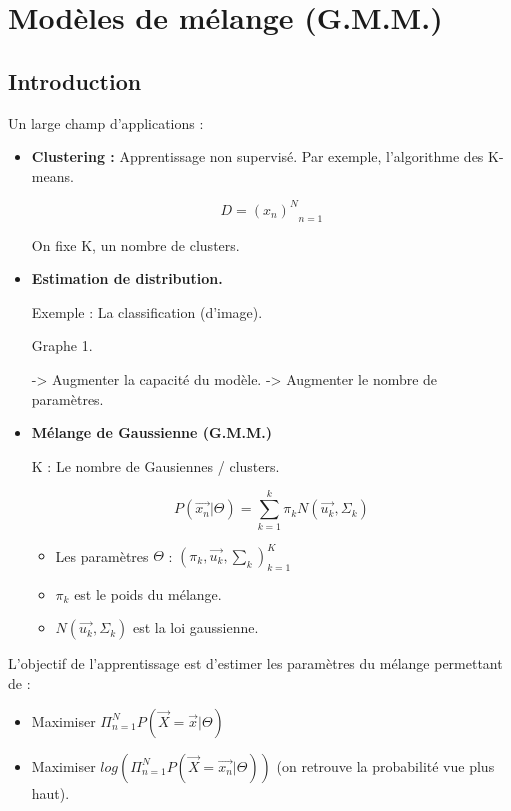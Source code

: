 \documentclass{article}
\begin{document}
\section{Modèles de mélange (G.M.M.)}

\subsection{Introduction}

Un large champ d'applications :

\begin{itemize}

\item \textbf{Clustering :} Apprentissage non supervisé. Par exemple, l'algorithme des K-means.

\[ D = {(x_n)^N}_{n=1}  \]

On fixe K, un nombre de clusters.

\item \textbf{Estimation de distribution.}

Exemple : La classification (d'image).

Graphe 1.

-> Augmenter la capacité du modèle.
-> Augmenter le nombre de paramètres.

\item \textbf{Mélange de Gaussienne (G.M.M.)}

K : Le nombre de Gausiennes / clusters.

\[ P(\vec{x_n} | \Theta) = \sum_{k=1}^k \pi_k N(\vec{u_k}, \Sigma_k) \]

\begin{itemize}

\item Les paramètres $\Theta$ : $(\pi_k, \vec{u_k}, \sum_k)_{k=1}^K$

\item $\pi_k$ est le poids du mélange.

\item $N(\vec{u_k}, \Sigma_k)$ est la loi gaussienne.

\end{itemize}

\end{itemize}

L'objectif de l'apprentissage est d'estimer les paramètres du mélange permettant de :

\begin{itemize}
\item Maximiser $ \Pi_{n=1}^N  P(\vec{X} = \vec{x} | \Theta)$

\item Maximiser $log(\Pi_{n=1}^N P(\vec{X} = \vec{x_n} | \Theta))$ (on retrouve la probabilité vue plus haut).

\end{itemize}
\end{document}
